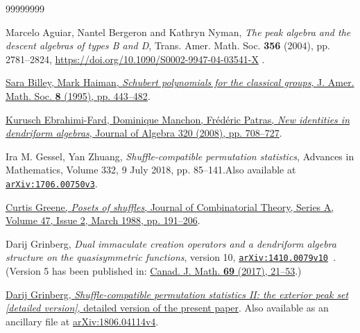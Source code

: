\documentclass[numbers=enddot,12pt,final,onecolumn,notitlepage]{scrartcl}%
\theoremstyle{definition}
\newenvironment{vershort}{}{}
\begin{document}
\begin{thebibliography}{99999999}                                                                                         %


Marcelo Aguiar, Nantel Bergeron and Kathryn Nyman,
\textit{The peak algebra and the descent algebras of types B and D},
Trans. Amer. Math. Soc. \textbf{356} (2004), pp. 2781--2824,
\url{https://doi.org/10.1090/S0002-9947-04-03541-X} .

%
\href{https://doi.org/10.1090/S0894-0347-1995-1290232-1}{Sara Billey, Mark
Haiman, \textit{Schubert polynomials for the classical groups}, J. Amer. Math.
Soc. \textbf{8} (1995), pp. 443--482}.

%
\href{https://doi.org/10.1016/j.jalgebra.2007.12.013}{Kurusch Ebrahimi-Fard,
Dominique Manchon, Fr\'{e}d\'{e}ric Patras, \textit{New identities in
dendriform algebras}, Journal of Algebra 320 (2008), pp. 708--727}.

Ira M. Gessel, Yan Zhuang, \textit{Shuffle-compatible
permutation statistics}, Advances in Mathematics, Volume 332, 9 July 2018, pp.
85--141.\newline Also available at
\texttt{\href{http://arxiv.org/abs/1706.00750v3}{arXiv:1706.00750v3}}.

%
\href{https://doi.org/10.1016/0097-3165(88)90018-0}{Curtis Greene,
\textit{Posets of shuffles}, Journal of Combinatorial Theory, Series A, Volume
47, Issue 2, March 1988, pp. 191--206}.

Darij Grinberg, \textit{Dual immaculate creation
operators and a dendriform algebra structure on the quasisymmetric functions},
version 10, \texttt{\href{https://arxiv.org/abs/1410.0079v10}{arXiv:1410.0079v10}%
}. (Version 5 has been published in:
\href{https://cms.math.ca/10.4153/CJM-2016-018-8?abfmt=ltx}{Canad. J. Math.
\textbf{69} (2017), 21--53}.)

\begin{vershort}


%
\href{http://www.cip.ifi.lmu.de/~grinberg/algebra/gzshuf2-long.pdf}{Darij
Grinberg, \textit{Shuffle-compatible permutation statistics II: the exterior
peak set [detailed version]}, detailed version of the present paper}. Also
available as an ancillary file at
\href{https://arxiv.org/abs/1806.04114v4}{arXiv:1806.04114v4}.
\end{vershort}


\end{thebibliography}
\end{document}
